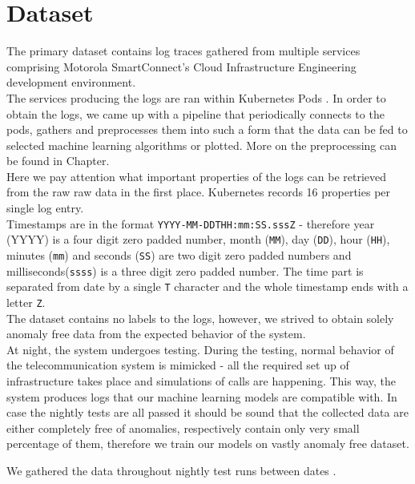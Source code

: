 \chapter{Dataset}

The primary dataset contains log traces gathered from multiple services comprising Motorola SmartConnect's Cloud Infrastructure Engineering development environment.\\
The services producing the logs are ran within Kubernetes Pods \cite{K8s:pods}. In order to obtain the logs, we came up with a pipeline that periodically connects to the pods, gathers and preprocesses them into such a form that the data can be fed to selected machine learning algorithms or plotted. More on the preprocessing can be found in Chapter.\\
Here we pay attention what important properties of the logs can be retrieved from the raw raw data in the first place.
Kubernetes records 16 properties per single log entry.\\
Timestamps are in the format \texttt{YYYY-MM-DDTHH:mm:SS.sssZ} - therefore year (YYYY) is a four digit zero padded number, month (\texttt{MM}), day (\texttt{DD}), hour (\texttt{HH}), minutes (\texttt{mm}) and seconds (\texttt{SS}) are two digit zero padded numbers and milliseconds(\texttt{ssss}) is a three digit zero padded number. The time part is separated from date by a single \texttt{T} character and the whole timestamp ends with a letter \texttt{Z}.\\

The dataset contains no labels to the logs, however, we strived to obtain solely anomaly free data from the expected behavior of the system.\\
At night, the system undergoes testing. During the testing, normal behavior of the telecommunication system is mimicked - all the required set up of infrastructure takes place and simulations of calls are happening. This way, the system produces logs that our machine learning models are compatible with.
In case the nightly tests are all passed it should be sound that the collected data are either completely free of anomalies, respectively contain only very small percentage of them, therefore we train our models on vastly anomaly free dataset.

We gathered the data throughout  nightly test runs between dates .


